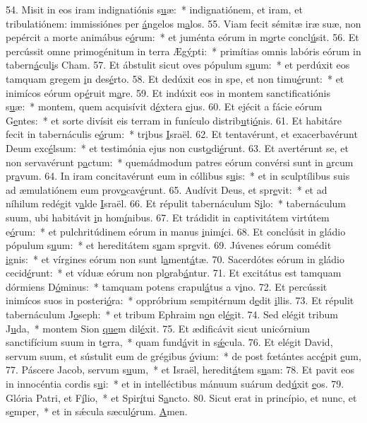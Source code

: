 54. Misit in eos iram indignatiónis s\uline{u}æ:~* indignatiónem, et iram, et tribulatiónem: immissiónes per \uline{á}ngelos m\uline{a}los.
55. Viam fecit sémitæ iræ suæ, non pepércit a morte animábus e\uline{ó}rum:~* et juménta eórum in m\uline{o}rte concl\uline{ú}sit.
56. Et percússit omne primogénitum in terra Æg\uline{ý}pti:~* primítias omnis labóris eórum in tabern\uline{á}cul\uline{i}s Cham.
57. Et ábstulit sicut oves pópulum s\uline{u}um:~* et perdúxit eos tamquam gregem \uline{i}n des\uline{é}rto.
58. Et dedúxit eos in spe, et non timu\uline{é}runt:~* et inimícos eórum op\uline{é}ruit m\uline{a}re.
59. Et indúxit eos in montem sanctificatiónis s\uline{u}æ:~* montem, quem acquisívit d\uline{é}xtera \uline{e}jus.
60. Et ejécit a fácie eórum G\uline{e}ntes:~* et sorte divísit eis terram in funículo distrib\uline{u}ti\uline{ó}nis.
61. Et habitáre fecit in tabernáculis e\uline{ó}rum:~* tr\uline{i}bus \uline{I}sraël.
62. Et tentavérunt, et exacerbavérunt Deum exc\uline{é}lsum:~* et testimónia ejus non cust\uline{o}di\uline{é}runt.
63. Et avertérunt se, et non servavérunt p\uline{a}ctum:~* quemádmodum patres eórum convérsi sunt in \uline{a}rcum pr\uline{a}vum.
64. In iram concitavérunt eum in cóllibus s\uline{u}is:~* et in sculptílibus suis ad æmulatiónem eum prov\uline{o}cav\uline{é}runt.
65. Audívit Deus, et spr\uline{e}vit:~* et ad níhilum redégit v\uline{a}lde \uline{I}sraël.
66. Et répulit tabernáculum S\uline{i}lo:~* tabernáculum suum, ubi habitávit \uline{i}n hom\uline{í}nibus.
67. Et trádidit in captivitátem virtútem e\uline{ó}rum:~* et pulchritúdinem eórum in manus \uline{i}nim\uline{í}ci.
68. Et conclúsit in gládio pópulum s\uline{u}um:~* et hereditátem s\uline{u}am spr\uline{e}vit.
69. Júvenes eórum comédit \uline{i}gnis:~* et vírgines eórum non sunt l\uline{a}ment\uline{á}tæ.
70. Sacerdótes eórum in gládio cecid\uline{é}runt:~* et víduæ eórum non pl\uline{o}rab\uline{á}ntur.
71. Et excitátus est tamquam dórmiens D\uline{ó}minus:~* tamquam potens crapul\uline{á}tus a v\uline{i}no.
72. Et percússit inimícos suos in posteri\uline{ó}ra:~* oppróbrium sempitérnum d\uline{e}dit \uline{i}llis.
73. Et répulit tabernáculum J\uline{o}seph:~* et tribum Ephraim n\uline{o}n el\uline{é}git.
74. Sed elégit tribum J\uline{u}da,~* montem Sion \uline{que}m dil\uline{é}xit.
75. Et ædificávit sicut unicórnium sanctifícium suum in t\uline{e}rra,~* quam fund\uline{á}vit in s\uline{ǽ}cula.
76. Et elégit David, servum suum, et sústulit eum de grégibus \uline{ó}vium:~* de post fœtántes acc\uline{é}pit \uline{e}um,
77. Páscere Jacob, servum s\uline{u}um,~* et Israël, heredit\uline{á}tem s\uline{u}am:
78. Et pavit eos in innocéntia cordis s\uline{u}i:~* et in intelléctibus mánuum suárum ded\uline{ú}xit \uline{e}os.
79. Glória Patri, et F\uline{í}lio,~* et Spir\uline{í}tui S\uline{a}ncto.
80. Sicut erat in princípio, et nunc, et s\uline{e}mper,~* et in sǽcula sæcul\uline{ó}rum. \uline{A}men.
